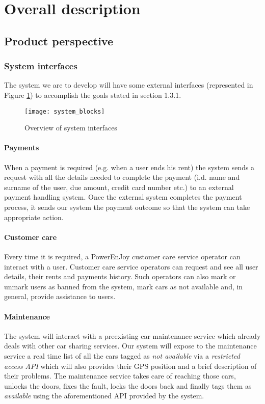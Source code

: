 \section{Overall description}
\subsection{Product perspective}
	\subsubsection{System interfaces}
	\label{sec:systemInterfaces}
		The system we are to develop will have some external interfaces (represented in Figure \ref{fig:systemInterfaces}) to accomplish the goals stated in section 1.3.1.
		\begin{figure}[h]
			\centering
			\texttt{[image: system\_blocks]}
			\caption{
				\label{fig:systemInterfaces} 
				Overview of system interfaces
			}
		\end{figure}
	\paragraph{Payments}
	When a payment is required (e.g. when a user ends his rent) the system sends a request with all the details needed to complete the payment (i.d. name and surname of the user, due amount, credit card number etc.) to an external payment handling system. Once the external system completes the payment process, it sends our system the payment outcome so that the system can take appropriate action.
	
	\paragraph{Customer care} Every time it is required, a PowerEnJoy customer care service operator can interact with a user. Customer care service operators can request and see all user details, their rents and payments history. Such operators can also mark or unmark users as banned from the system, mark cars as not available and, in general, provide assistance to users.

	\paragraph{Maintenance} The system will interact with a preexisting car maintenance service which already deals with other car sharing services. Our system will expose to the maintenance service a real time list of all the cars tagged as \emph{not available} via a \emph{restricted access API} which will also provides their GPS position and a brief description of their problems. The maintenance service takes care of reaching those cars, unlocks the doors,  fixes the fault, locks the doors back and finally tags them as \emph{available} using the aforementioned  API provided by the system.
	
